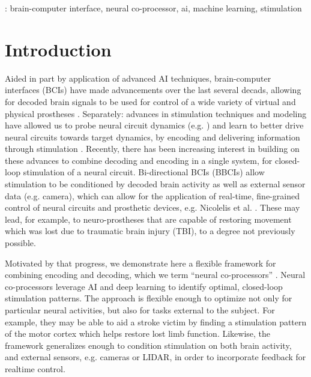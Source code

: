 \documentclass[12pt]{iopart}
\begin{document}
\vspace{2pc}
: brain-computer interface, neural co-processor, ai, machine learning, stimulation
%
%
\maketitle
% 
%



\section{Introduction}
Aided in part by application of advanced AI techniques, brain-computer interfaces (BCIs) have made
advancements over the last several decads, allowing for decoded brain signals to be used for
control of a wide variety of virtual and physical prostheses \cite{rao.bcibook, wolpaw.bcibook,
moritz.neuro, lebedev.bmi}. Separately: advances in stimulation techniques and modeling have allowed
us to probe neural circuit dynamics (e.g. \cite{walker.inception}) and learn to better drive neural
circuits towards target dynamics, by encoding and delivering information through
stimulation \cite{niparko.cochlear, weiland.retinal, tomlinson.propr, tabot.tact, tyler.tact,
dadarlat.tact, sharlene.tact, cronin.tact}.
Recently, there has been increasing interest in building on these advances to combine decoding
and encoding in a single system, for closed-loop stimulation of a neural circuit. Bi-directional
BCIs (BBCIs) allow stimulation to be conditioned by decoded brain activity as well as external
sensor data (e.g. camera), which can allow for the application of real-time, fine-grained control of
neural circuits and prosthetic devices, e.g. Nicolelis et al. \cite{nicolelis.bmbi}. These may lead,
for example, to neuro-prostheses that are capable of restoring movement which was lost due to
traumatic brain injury (TBI), to a degree not previously possible.

Motivated by that progress, we demonstrate here a flexible framework for combining encoding
and decoding, which we term ``neural co-processors'' \cite{rao.coproc}. Neural co-processors leverage
AI and deep learning to identify optimal, closed-loop stimulation patterns. The approach is flexible
enough to optimize not only for particular neural activities, but also for tasks external to the
subject. For example, they may be able to aid a stroke victim by finding a stimulation pattern of
the motor cortex which helps restore lost limb function. Likewise, the framework generalizes enough
to condition stimulation on both brain activity, and external sensors, e.g. cameras or LIDAR, in
order to incorporate feedback for realtime control.
\end{document}
